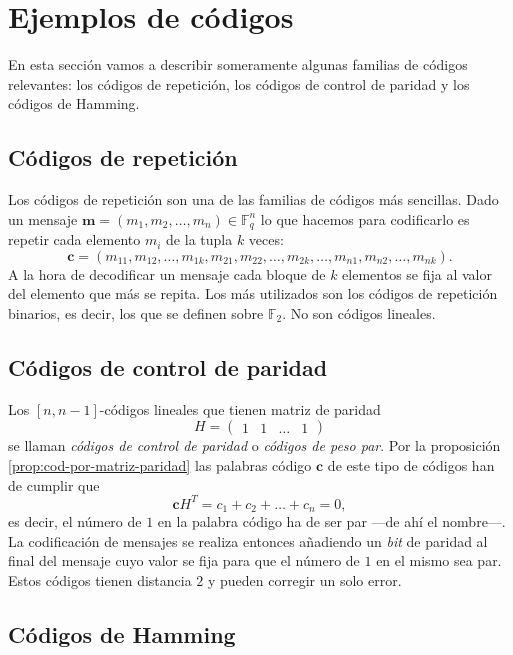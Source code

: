 \section{Ejemplos de códigos}

En esta sección vamos a describir someramente algunas familias de códigos relevantes: los códigos de repetición, los códigos de control de paridad y los códigos de Hamming.

\subsection{Códigos de repetición}

Los códigos de repetición son una de las familias de códigos más sencillas.
Dado un mensaje \(\mathbf{m} = (m_1, m_2, \dots, m_n) \in \mathbb F_q^n\) lo que hacemos para codificarlo es repetir cada elemento \(m_i\) de la tupla \(k\) veces: 
\[
  \mathbf{c} = (m_{11}, m_{12}, \dots, m_{1k}, m_{21}, m_{22}, \dots, m_{2k}, \dots, m_{n1}, m_{n2}, \dots, m_{nk}).
\]
A la hora de decodificar un mensaje cada bloque de \(k\) elementos se fija al valor del elemento que más se repita. 
Los más utilizados son los códigos de repetición binarios, es decir, los que se definen sobre \(\mathbb F_2\).
No son códigos lineales.

\subsection{Códigos de control de paridad}

Los \([n, n -1]\)-códigos lineales que tienen matriz de paridad \[
  H = \begin{pmatrix}
    1 & 1 & \dots & 1
  \end{pmatrix}
\] se llaman \textit{códigos de control de paridad} o \textit{códigos de peso par}.
Por la proposición \ref{prop:cod-por-matriz-paridad} las palabras código \(\mathbf{c}\) de este tipo de códigos han de cumplir que
\[
  \mathbf{c}H^T = c_1 + c_2 + \dots + c_n = 0,
\]
es decir, el número de \(1\) en la palabra código ha de ser par —de ahí el nombre—.
La codificación de mensajes se realiza entonces añadiendo un \textit{bit} de paridad al final del mensaje cuyo valor se fija para que el número de \(1\) en el mismo sea par.
Estos códigos tienen distancia \(2\) y pueden corregir un solo error.

\subsection{Códigos de Hamming}

